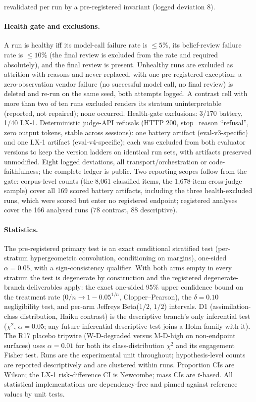 \documentclass[11pt]{article}
\begin{document}
revalidated per run by a pre-registered invariant (logged deviation 8).

\paragraph{Health gate and exclusions.} A run is healthy iff its model-call failure rate is $\leq 5\%$, its belief-review failure rate is $\leq 10\%$ (the final review is excluded from the rate and required absolutely), and the final review is present. Unhealthy runs are excluded as attrition with reasons and never replaced, with one pre-registered exception: a zero-observation vendor failure (no successful model call, no final review) is deleted and re-run on the same seed, both attempts logged. A contrast cell with more than two of ten runs excluded renders its stratum uninterpretable (reported, not repaired); none occurred. Health-gate exclusions: 3/170 battery, 1/40 LX-1. Deterministic judge-API refusals (HTTP 200, stop\_reason ``refusal'', zero output tokens, stable across sessions): one battery artifact (eval-v3-specific) and one LX-1 artifact (eval-v4-specific); each was excluded from both evaluator versions to keep the version ladders on identical run sets, with artifacts preserved unmodified. Eight logged deviations, all transport/orchestration or code-faithfulness; the complete ledger is public. Two reporting scopes follow from the gate: corpus-level counts (the 8{,}061 classified items, the 1{,}678-item cross-judge sample) cover all 169 scored battery artifacts, including the three health-excluded runs, which were scored but enter no registered endpoint; registered analyses cover the 166 analysed runs (78 contrast, 88 descriptive).

\paragraph{Statistics.} The pre-registered primary test is an exact conditional stratified test (per-stratum hypergeometric convolution, conditioning on margins), one-sided $\alpha = 0.05$, with a sign-consistency qualifier. With both arms empty in every stratum the test is degenerate by construction and the registered degenerate-branch deliverables apply: the exact one-sided 95\% upper confidence bound on the treatment rate ($0/n \rightarrow 1 - 0.05^{1/n}$, Clopper--Pearson\cite{clopper1934}), the $\delta = 0.10$ negligibility test, and per-arm Jeffreys Beta($1/2$, $1/2$) intervals\cite{jeffreys1946}. D1 (assimilation-class distribution, Haiku contrast) is the descriptive branch's only inferential test ($\chi^2$, $\alpha = 0.05$; any future inferential descriptive test joins a Holm family with it). The R17 placebo tripwire (W-D-degraded versus M-D-high on non-endpoint surfaces) uses $\alpha = 0.01$ for both its class-distribution $\chi^2$ and its engagement Fisher test. Runs are the experimental unit throughout; hypothesis-level counts are reported descriptively and are clustered within runs. Proportion CIs are Wilson\cite{wilson1927}; the LX-1 risk-difference CI is Newcombe\cite{newcombe1998}; mass CIs are $t$-based. All statistical implementations are dependency-free and pinned against reference values by unit tests.
\end{document}
